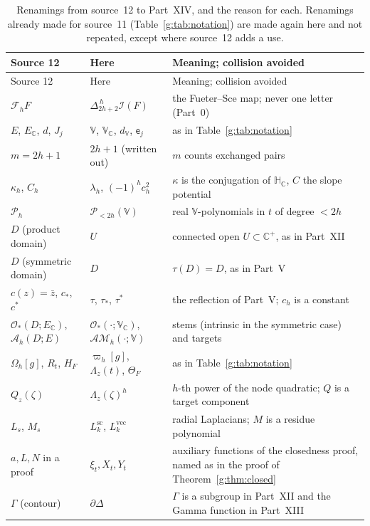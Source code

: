 \documentclass[11pt,a4paper]{article}
\numberwithin{equation}{section}
\theoremstyle{definition}
\theoremstyle{remark}
\theoremstyle{plain}
\newcommand{\HC}{\mathbb H_{\mathbb C}}
\newcommand{\CC}{\mathbb C}
\newcommand{\Cplus}{\CC^{+}}
\newcommand{\I}{\mathcal I}
\newcommand{\AM}{\mathcal{AM}}
\newcommand{\lapH}{\Delta_{2h+2}^{\,h}}
\newcommand{\VV}{\mathbb V}                       %
\newcommand{\VC}{\mathbb V_{\CC}}                 %
\newcommand{\dV}{d_{\VV}}                         %
\newcommand{\PolH}{\mathscr P_{<2h}(\VV)}
\newcommand{\cur}{\varpi}                         %
\newcommand{\Herm}{\Theta}                        %
\newcommand{\Rq}{\Lambda}                         %
\begin{document}
{\small
\renewcommand{\arraystretch}{1.22}
\begin{longtable}{@{}p{}p{}p{}@{}}
\caption{Renamings from source~12 to Part~XIV, and the reason for each.
Renamings already made for source~11 (Table~\ref{g:tab:notation}) are made
again here and not repeated, except where source~12 adds a use.}
\label{h:tab:notation}\\
\toprule
Source 12 & Here & Meaning; collision avoided\\
\midrule
\endfirsthead
\toprule
Source 12 & Here & Meaning; collision avoided\\
\midrule
\endhead
$\mathcal F_hF$ & $\lapH\I(F)$ & the Fueter--Sce map; never one letter
 (Part~0)\\
$E$, $E_\CC$, $d$, $J_j$ & $\VV$, $\VC$, $\dV$, $\mathsf e_j$ & as in
 Table~\ref{g:tab:notation}\\
$m=2h+1$ & $2h+1$ (written out) & $m$ counts exchanged pairs\\
$\kappa_h$, $C_h$ & $\lambda_h$, $(-1)^hc_h^2$ & $\kappa$ is the conjugation of
 $\HC$, $C$ the slope potential\\
$\mathscr P_h$ & $\PolH$ & real $\VV$-polynomials in $t$ of degree $<2h$\\
$D$ (product domain) & $U$ & connected open $U\subset\Cplus$, as in Part~XII\\
$D$ (symmetric domain) & $D$ & $\tau(D)=D$, as in Part~V\\
$c(z)=\bar z$, $c_*$, $c^*$ & $\tau$, $\tau_*$, $\tau^*$ & the reflection of
 Part~V; $c_h$ is a constant\\
$\mathcal O_*(D;E_\CC)$, $\mathcal A_h(D;E)$ & $\mathcal O_*(\cdot;\VC)$,
 $\AM_h(\cdot;\VV)$ & stems (intrinsic in the symmetric case) and targets\\
$\Omega_h[g]$, $R_t$, $H_F$ & $\cur_h[g]$, $\Rq_z(t)$, $\Herm_F$ & as in
 Table~\ref{g:tab:notation}\\
$Q_z(\zeta)$ & $\Rq_z(\zeta)^h$ & $h$-th power of the node quadratic; $Q$ is a
 target component\\
$L_s$, $M_s$ & $L^{\mathrm{sc}}_k$, $L^{\mathrm{vec}}_k$ & radial Laplacians;
 $M$ is a residue polynomial\\
$a,L,N$ in a proof & $\xi_t,X_t,Y_t$ & auxiliary functions of the
 closedness proof, named as in the proof of Theorem~\ref{g:thm:closed}\\
$\Gamma$ (contour) & $\partial\Delta$ & $\Gamma$ is a subgroup in Part~XII and
 the Gamma function in Part~XIII\\

\end{longtable}}
\end{document}
